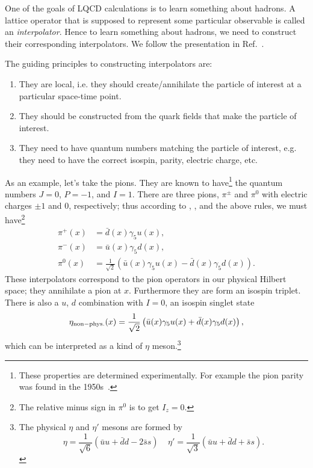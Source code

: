 One of the goals of LQCD calculations is to learn something about hadrons. A
lattice operator that is supposed to represent some particular observable is
called an {\it interpolator}. Hence to learn something
about hadrons, we need to construct their corresponding interpolators. We follow
the presentation in Ref.~\cite{gattringer_quantum_2010}.

The guiding principles to constructing interpolators are:
\begin{enumerate}
  \item They are local, i.e. they should create/annihilate the particle of
        interest at a particular space-time point.
  \item They should be constructed from the quark fields that make the particle
        of interest.
  \item They need to have quantum numbers matching the particle of interest,
        e.g. they need to have the correct isospin, parity, electric charge,
        etc.
\end{enumerate} 
As an example, let's take the pions. They are known to
have\footnote{These properties are determined experimentally. For
example the pion parity was found in the 1950s~\cite{chinowsky_reaction_1955}.} 
the quantum numbers $J=0$, $P=-1$, and $I=1$. There are three
pions, $\pi^{\pm}$ and $\pi^0$ with electric charges $\pm1$ and 0,
respectively; thus according to ,
, and the above rules, we must have\footnote{The relative
minus sign in $\pi^0$ is to get $I_z=0$.}
\begin{equation}\begin{aligned}
  \pi^+(x) &= \bar{d}(x)\gamma_5u(x),\\
  \pi^-(x) &= \bar{u}(x)\gamma_5d(x),\\
  \pi^0(x) &= \frac{1}{\sqrt{2}}\left( \bar{u}(x)\gamma_5u(x)
                                      -\bar{d}(x)\gamma_5d(x)\right).
\end{aligned}\end{equation}
These interpolators correspond to the pion operators in our physical Hilbert
space; they annihilate a pion at $x$. Furthermore they are form an
isospin triplet. There is also a $u$, $d$ combination
with $I=0$, an isospin singlet state
\begin{equation}
\eta_{\rm non-phys.}(x)= \frac{1}{\sqrt{2}}\left( \bar{u}(x)\gamma_5u(x)
                                      +\bar{d}(x)\gamma_5d(x)\right),
\end{equation}
which can be interpreted as a kind of $\eta$ 
meson.\footnote{The physical $\eta$ and $\eta'$ mesons are formed by 
$$
\eta= \frac{1}{\sqrt{6}}\left( \bar{u}u+\bar{d}d-2\bar{s}s\right)~~~~~
\eta'= \frac{1}{\sqrt{3}}\left( \bar{u}u+\bar{d}d+\bar{s}s\right).
$$
}

